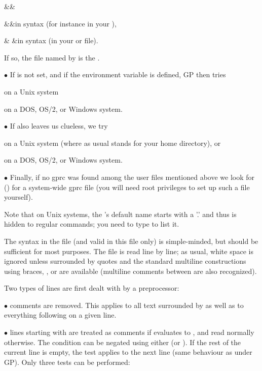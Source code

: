 \settabs\+\indent&\quad&\cr

\+&\quad&in  syntax
(for instance in your ),\cr

\+& &in  syntax
(in your  or  file).\cr

\noindent If so, the file named by  is the .

\noindent$\bullet$ If  is not set, and if the environment variable
 is defined, GP then tries

 on a Unix system

 on a DOS, OS/2, or Windows system.

\noindent$\bullet$ If  also leaves us clueless, we try

\strut{} on a Unix system (where as usual \kbd{\til} stands for
your home directory), or

 on a DOS, OS/2, or Windows system.

\noindent$\bullet$ Finally, if no gprc was found among the user files
mentioned above we look for  ()
for a system-wide gprc file (you will need root privileges to set up such a
file yourself).

Note that on Unix systems, the 's default name starts with a '.' and
thus is hidden to regular  commands; you need to type  to
list it.


The syntax in the  file (and valid in this file only) is
simple-minded, but should be sufficient for most purposes. The file is read
line by line; as usual, white space is ignored unless surrounded by quotes
and the standard multiline constructions using braces, \kbd{\bs}, or \kbd{=}
are available (multiline comments between \kbd{/*~\dots~*/} are also
recognized).

Two types of lines are first dealt with by a preprocessor:

$\bullet$ comments are removed. This applies to all text surrounded by
\kbd{/*~\dots~*/} as well as to everything following \kbd{\bs\bs} on a given
line.

$\bullet$ lines starting with   are treated as
comments if  evaluates to , and read normally
otherwise. The condition can be negated using either  (or
). If the rest of the current line is empty, the test applies to
the next line (same behaviour as \kbd{=} under GP). Only three tests can be
performed:

